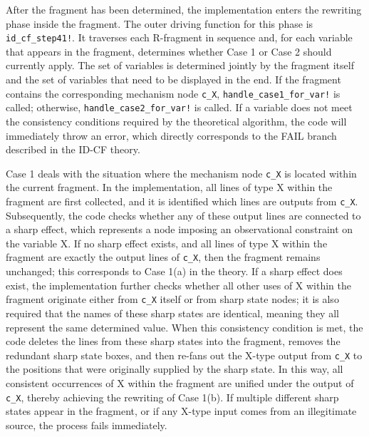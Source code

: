 \documentclass[a4paper]{report}
\begin{document}
After the fragment has been determined, the implementation enters the rewriting phase inside the fragment. The outer driving function for this phase is \texttt{id\_cf\_step41!}. It traverses each R-fragment in sequence and, for each variable that appears in the fragment, determines whether Case 1 or Case 2 should currently apply. The set of variables is determined jointly by the fragment itself and the set of variables that need to be displayed in the end. If the fragment contains the corresponding mechanism node \texttt{c\_X}, \texttt{handle\_case1\_for\_var!} is called; otherwise, \texttt{handle\_case2\_for\_var!} is called. If a variable does not meet the consistency conditions required by the theoretical algorithm, the code will immediately throw an error, which directly corresponds to the FAIL branch described in the ID-CF theory.

Case 1 deals with the situation where the mechanism node \texttt{c\_X} is located within the current fragment. In the implementation, all lines of type X within the fragment are first collected, and it is identified which lines are outputs from \texttt{c\_X}. Subsequently, the code checks whether any of these output lines are connected to a sharp effect, which represents a node imposing an observational constraint on the variable X. If no sharp effect exists, and all lines of type X within the fragment are exactly the output lines of \texttt{c\_X}, then the fragment remains unchanged; this corresponds to Case 1(a) in the theory. If a sharp effect does exist, the implementation further checks whether all other uses of X within the fragment originate either from \texttt{c\_X} itself or from sharp state nodes; it is also required that the names of these sharp states are identical, meaning they all represent the same determined value. When this consistency condition is met, the code deletes the lines from these sharp states into the fragment, removes the redundant sharp state boxes, and then re-fans out the X-type output from \texttt{c\_X} to the positions that were originally supplied by the sharp state. In this way, all consistent occurrences of X within the fragment are unified under the output of \texttt{c\_X}, thereby achieving the rewriting of Case 1(b). If multiple different sharp states appear in the fragment, or if any X-type input comes from an illegitimate source, the process fails immediately.
\end{document}
